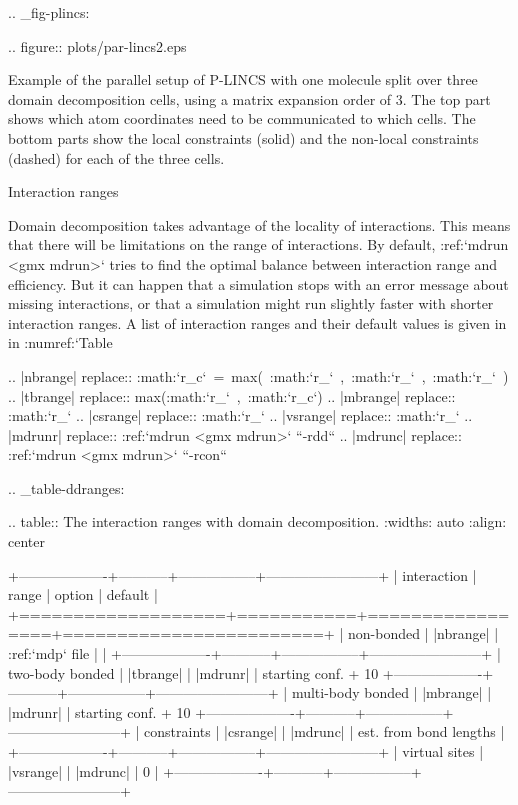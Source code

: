 .. _fig-plincs:

.. figure:: plots/par-lincs2.eps

   Example of the parallel setup of P-LINCS with one molecule
   split over three domain decomposition cells, using a matrix expansion
   order of 3. The top part shows which atom coordinates need to be
   communicated to which cells. The bottom parts show the local
   constraints (solid) and the non-local constraints (dashed) for each
   of the three cells.

Interaction ranges
~~~~~~~~~~~~~~~~~~

Domain decomposition takes advantage of the locality of interactions.
This means that there will be limitations on the range of interactions.
By default, :ref:`mdrun <gmx mdrun>` tries to find the optimal balance
between interaction range and efficiency. But it can happen that a
simulation stops with an error message about missing interactions, or
that a simulation might run slightly faster with shorter interaction
ranges. A list of interaction ranges and their default values is given
in in :numref:`Table %

.. |nbrange| replace:: :math:`r_c`\ =\ max(\ :math:`r_{}`\ ,\ :math:`r_{}`\ ,\ :math:`r_{}`\ )
.. |tbrange| replace:: max(:math:`r_{}`\ ,\ :math:`r_c`) 
.. |mbrange| replace:: :math:`r_{}` 
.. |csrange| replace:: :math:`r_{}`
.. |vsrange| replace:: :math:`r_{}` 
.. |mdrunr| replace:: :ref:`mdrun <gmx mdrun>` ``-rdd``
.. |mdrunc| replace:: :ref:`mdrun <gmx mdrun>` ``-rcon``

.. _table-ddranges:

.. table:: The interaction ranges with domain decomposition.
    :widths: auto
    :align: center

    +-------------------+-----------+-----------------+------------------------+
    | interaction       | range     | option          | default                |
    +===================+===========+=================+========================+
    | non-bonded        | |nbrange| | :ref:`mdp` file |                        |
    +-------------------+-----------+-----------------+------------------------+
    | two-body bonded   | |tbrange| | |mdrunr|        | starting conf. + 10%
    +-------------------+-----------+-----------------+------------------------+
    | multi-body bonded | |mbrange| | |mdrunr|        | starting conf. + 10%
    +-------------------+-----------+-----------------+------------------------+
    | constraints       | |csrange| | |mdrunc|        | est. from bond lengths |
    +-------------------+-----------+-----------------+------------------------+
    | virtual sites     | |vsrange| | |mdrunc|        | 0                      |
    +-------------------+-----------+-----------------+------------------------+


